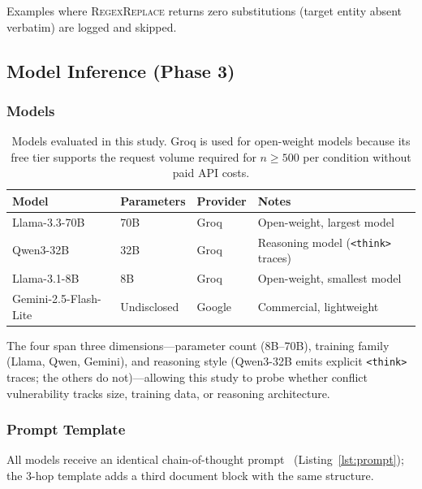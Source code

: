 Examples where \textsc{RegexReplace} returns zero substitutions (target entity absent verbatim) are logged and skipped.

\subsection{Model Inference (Phase 3)}
\label{sec:inference}

\subsubsection{Models}

\begin{table}[!ht]
\centering
\caption{Models evaluated in this study. Groq is used for open-weight models because its free tier supports the request volume required for $n \geq 500$ per condition without paid API costs.}
\label{tab:models}
\begin{tabular}{llll}
\toprule
\textbf{Model} & \textbf{Parameters} & \textbf{Provider} & \textbf{Notes} \\
\midrule
Llama-3.3-70B & 70B & Groq & Open-weight, largest model \\
Qwen3-32B & 32B & Groq & Reasoning model (\texttt{<think>} traces) \\
Llama-3.1-8B & 8B & Groq & Open-weight, smallest model \\
Gemini-2.5-Flash-Lite & Undisclosed & Google & Commercial, lightweight \\
\bottomrule
\end{tabular}
\end{table}

The four span three dimensions---parameter count (8B--70B), training family (Llama, Qwen, Gemini), and reasoning style (Qwen3-32B emits explicit \texttt{<think>} traces; the others do not)---allowing this study to probe whether conflict vulnerability tracks size, training data, or reasoning architecture.

\subsubsection{Prompt Template}

All models receive an identical chain-of-thought prompt~\citep{wei2022chain} (Listing~\ref{lst:prompt}); the 3-hop template adds a third document block with the same structure.

